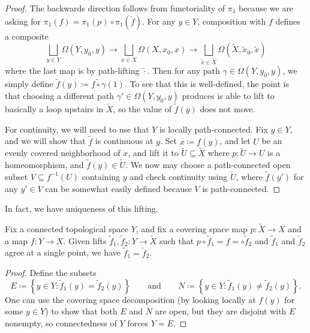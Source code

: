 \documentclass[../notes.tex]{subfiles}
\begin{document}
\begin{proof}
	The backwards direction follows from functoriality of $\pi_1$ because we are asking for $\pi_1(f)=\pi_1(p)\circ\pi_1(\widetilde f)$. For any $y\in Y$, composition with $f$ defines a composite
	\[\bigsqcup_{y\in Y}\Omega(Y,y_0,y)\to\bigsqcup_{x\in X}\Omega(X,x_0,x)\to\bigsqcup_{\widetilde x\in\widetilde X}\Omega(\widetilde X,\widetilde x_0,\widetilde x)\]
	where the last map is by path-lifting $\widetilde\cdot$. Then for any path $\gamma\in\Omega(Y,y_0,y)$, we simply define $\widetilde f(y)\coloneqq\widetilde{f\circ\gamma}(1)$. To see that this is well-defined, the point is that choosing a different path $\gamma'\in\Omega(Y,y_0,y)$ produces is able to lift to basically a loop upstairs in $\widetilde X$, so the value of $\widetilde f(y)$ does not move.

	For continuity, we will need to use that $Y$ is locally path-connected. Fix $y\in Y$, and we will show that $\widetilde f$ is continuous at $y$. Set $x\coloneqq f(y)$, and let $U$ be an evenly covered neighborhood of $x$, and lift it to $\widetilde U\subseteq\widetilde X$ where $p\colon\widetilde U\to U$ is a homeomorphism, and $\widetilde f(y)\in\widetilde U$. We now may choose a path-connected open subset $V\subseteq f^{-1}(U)$ containing $y$ and check continuity using $\widetilde U$, where $\widetilde f(y')$ for any $y'\in V$ can be somewhat easily defined because $V$ is path-connected.
\end{proof}
In fact, we have uniqueness of this lifting.
\begin{proposition}
	Fix a connected topological space $Y$, and fix a covering space map $p\colon\widetilde X\to X$ and a map $f\colon Y\to X$. Given lifts $\widetilde f_1,\widetilde f_2\colon Y\to\widetilde X$ such that $p\circ\widetilde f_1=f=\circ\widetilde f_2$ and $\widetilde f_1$ and $\widetilde f_2$ agree at a single point, we have $\widetilde f_1=\widetilde f_2$.
\end{proposition}
\begin{proof}
	Define the subsets
	\[E\coloneqq\left\{y\in Y:\widetilde f_1(y)=\widetilde f_2(y)\right\}\qquad\text{and}\qquad N\coloneqq\left\{y\in Y:\widetilde f_1(y)\ne\widetilde f_2(y)\right\}.\]
	One can use the covering space decomposition (by looking locally at $f(y)$ for some $y\in Y$) to show that both $E$ and $N$ are open, but they are disjoint with $E$ nonempty, so connectedness of $Y$ forces $Y=E$.
\end{proof}
\end{document}
